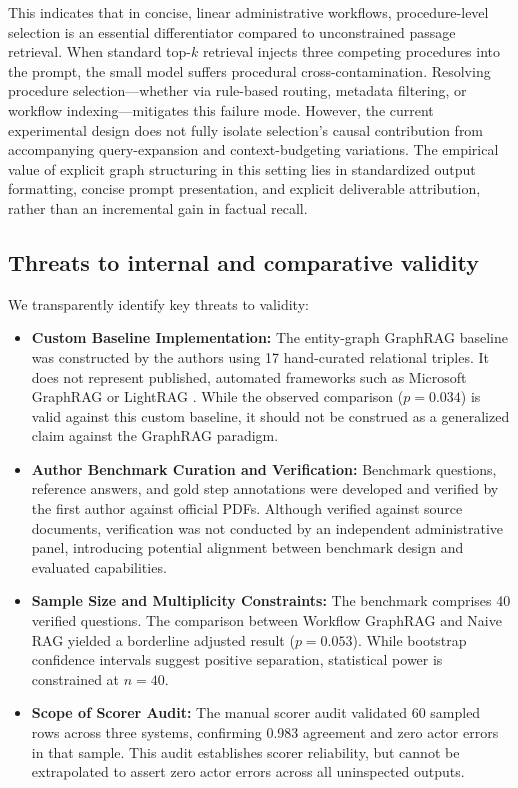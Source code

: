 \documentclass[preprint,10pt]{elsarticle}
\begin{document}
This indicates that in concise, linear administrative workflows, procedure-level selection is an essential differentiator compared to unconstrained passage retrieval. When standard top-$k$ retrieval injects three competing procedures into the prompt, the small model suffers procedural cross-contamination. Resolving procedure selection---whether via rule-based routing, metadata filtering, or workflow indexing---mitigates this failure mode. However, the current experimental design does not fully isolate selection's causal contribution from accompanying query-expansion and context-budgeting variations. The empirical value of explicit graph structuring in this setting lies in standardized output formatting, concise prompt presentation, and explicit deliverable attribution, rather than an incremental gain in factual recall.

\subsection{Threats to internal and comparative validity}
We transparently identify key threats to validity:
\begin{itemize}[leftmargin=*]
\item \textbf{Custom Baseline Implementation:} The entity-graph GraphRAG baseline was constructed by the authors using 17 hand-curated relational triples. It does not represent published, automated frameworks such as Microsoft GraphRAG \cite{edge2024graphrag} or LightRAG \cite{guo2024lightrag}. While the observed comparison ($p=0.034$) is valid against this custom baseline, it should not be construed as a generalized claim against the GraphRAG paradigm.
\item \textbf{Author Benchmark Curation and Verification:} Benchmark questions, reference answers, and gold step annotations were developed and verified by the first author against official PDFs. Although verified against source documents, verification was not conducted by an independent administrative panel, introducing potential alignment between benchmark design and evaluated capabilities.
\item \textbf{Sample Size and Multiplicity Constraints:} The benchmark comprises 40 verified questions. The comparison between Workflow GraphRAG and Naive RAG yielded a borderline adjusted result ($p = 0.053$). While bootstrap confidence intervals suggest positive separation, statistical power is constrained at $n=40$.
\item \textbf{Scope of Scorer Audit:} The manual scorer audit validated 60 sampled rows across three systems, confirming 0.983 agreement and zero actor errors in that sample. This audit establishes scorer reliability, but cannot be extrapolated to assert zero actor errors across all uninspected outputs.
\end{itemize}
\end{document}
